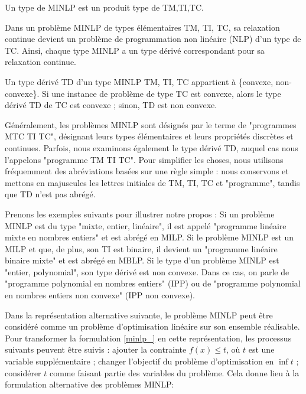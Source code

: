 \begin{definition}
Un type de MINLP est un produit type de TM,TI,TC.
\end{definition}

Dans un problème MINLP de types élémentaires TM, TI, TC, sa relaxation continue devient un problème de programmation non linéaire (NLP) d'un type de TC. Ainsi, chaque type MINLP a un type dérivé correspondant pour sa relaxation continue.

\begin{definition}
    Un type dérivé TD d'un type MINLP TM, TI, TC appartient à \{convexe, non-convexe\}. Si une instance de problème de type TC est convexe, alors le type dérivé TD de TC est convexe ; sinon, TD est non convexe.
\end{definition}

Généralement, les problèmes MINLP sont désignés par le terme de "programmes MTC TI TC", désignant leurs types élémentaires et leurs propriétés discrètes et continues. Parfois, nous examinons également le type dérivé TD, auquel cas nous l'appelons "programme TM TI TC". Pour simplifier les choses, nous utilisons fréquemment des abréviations basées sur une règle simple : nous conservons et mettons en majuscules les lettres initiales de TM, TI, TC et "programme", tandis que TD n'est pas abrégé.

Prenons les exemples suivants pour illustrer notre propos :
 Si un problème MINLP est du type "mixte, entier, linéaire", il est appelé "programme linéaire mixte en nombres entiers" et est abrégé en MILP. Si le problème MINLP est un MILP et que, de plus, son TI est binaire, il devient un "programme linéaire binaire mixte" et est abrégé en MBLP.  Si le type d'un problème MINLP est "entier, polynomial", son type dérivé est non convexe. Dans ce cas, on parle de "programme polynomial en nombres entiers" (IPP) ou de "programme polynomial en nombres entiers non convexe" (IPP non convexe).


Dans la représentation alternative suivante, le problème MINLP peut être considéré comme un problème d'optimisation linéaire sur son ensemble réalisable. Pour transformer la formulation \eqref{minlp_} en cette représentation, les processus suivants peuvent être suivis : ajouter la contrainte $f(x) \le t$, où $t$ est une variable supplémentaire ; changer l'objectif du problème d'optimisation en $\inf t$ ;
considérer $t$ comme faisant partie des variables du problème.
Cela donne lieu à la formulation alternative des problèmes MINLP:

